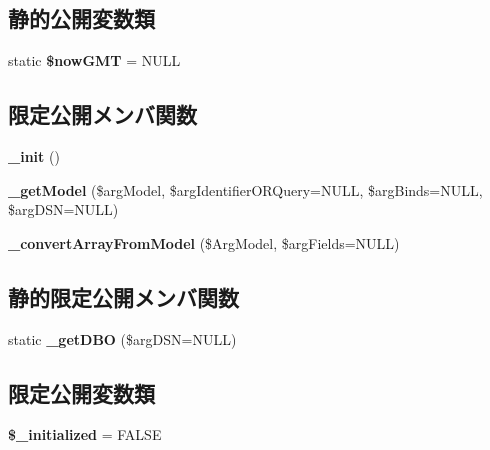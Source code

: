 \subsection*{静的公開変数類}
\begin{DoxyCompactItemize}
\item 
\hypertarget{class_rest_controller_base_a89efa2069bb58cdb9d2d8c215ca7026f}{}static {\bfseries \$now\+G\+M\+T} = N\+U\+L\+L\label{class_rest_controller_base_a89efa2069bb58cdb9d2d8c215ca7026f}

\end{DoxyCompactItemize}
\subsection*{限定公開メンバ関数}
\begin{DoxyCompactItemize}
\item 
\hypertarget{class_rest_controller_base_a698e344e2c6f158a37defa29015dc05d}{}{\bfseries \+\_\+init} ()\label{class_rest_controller_base_a698e344e2c6f158a37defa29015dc05d}

\item 
\hypertarget{class_rest_controller_base_af8b8730ca0146b74caeeb0bd302fdee0}{}{\bfseries \+\_\+get\+Model} (\$arg\+Model, \$arg\+Identifier\+O\+R\+Query=N\+U\+L\+L, \$arg\+Binds=N\+U\+L\+L, \$arg\+D\+S\+N=N\+U\+L\+L)\label{class_rest_controller_base_af8b8730ca0146b74caeeb0bd302fdee0}

\item 
\hypertarget{class_rest_controller_base_a94426891fdd91eafa514539524514056}{}{\bfseries \+\_\+convert\+Array\+From\+Model} (\$Arg\+Model, \$arg\+Fields=N\+U\+L\+L)\label{class_rest_controller_base_a94426891fdd91eafa514539524514056}

\end{DoxyCompactItemize}
\subsection*{静的限定公開メンバ関数}
\begin{DoxyCompactItemize}
\item 
\hypertarget{class_rest_controller_base_a87e1a761d90332ddff422cefe3f65b16}{}static {\bfseries \+\_\+get\+D\+B\+O} (\$arg\+D\+S\+N=N\+U\+L\+L)\label{class_rest_controller_base_a87e1a761d90332ddff422cefe3f65b16}

\end{DoxyCompactItemize}
\subsection*{限定公開変数類}
\begin{DoxyCompactItemize}
\item 
\hypertarget{class_rest_controller_base_a1cc144075c95012b24a82aa964ded88c}{}{\bfseries \$\+\_\+initialized} = F\+A\+L\+S\+E\label{class_rest_controller_base_a1cc144075c95012b24a82aa964ded88c}

\end{DoxyCompactItemize}


